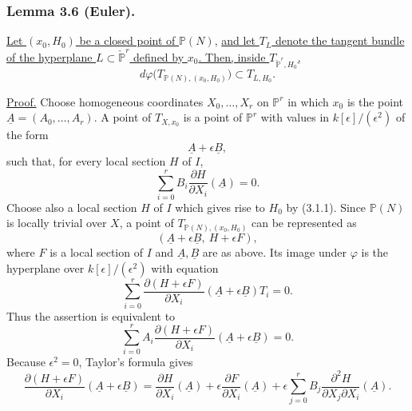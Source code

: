 \subsubsection*{Lemma 3.6 (Euler).}
\underline{Let $(x_0,H_0)$ be a closed point of $\mathbb P(N)$}, \underline{and
let $T_L$ denote the tangent bundle of the hyperplane
$L\subset\check{\mathbb P}^{r}$ defined by $x_0$.  Then, inside
$T_{\check{\mathbb P}^{r},H_0}$,}
\[
d\varphi\bigl(T_{\mathbb P(N),(x_0,H_0)}\bigr)
\subset T_{L,H_0}.
\]

\noindent\underline{Proof.}
Choose homogeneous coordinates $X_0,\ldots,X_r$ on $\mathbb P^r$ in
which $x_0$ is the point
$\underline A=(A_0,\ldots,A_r)$.  A point of $T_{X,x_0}$ is a point
of $\mathbb P^r$ with values in $k[\epsilon]/(\epsilon^2)$ of the
form
\begin{equation}\tag{3.6.1}
\underline A+\epsilon\underline B,
\end{equation}
such that, for every local section $H$ of $I$,
\begin{equation}\tag{3.6.2}
\sum_{i=0}^{r}B_i\frac{\partial H}{\partial X_i}(\underline A)=0.
\end{equation}
Choose also a local section $H$ of $I$ which gives rise to $H_0$ by
(3.1.1).  Since $\mathbb P(N)$ is locally trivial over $X$, a point
of $T_{\mathbb P(N),(x_0,H_0)}$ can be represented as
\begin{equation}\tag{3.6.3}
(\underline A+\epsilon\underline B,\ H+\epsilon F),
\end{equation}
where $F$ is a local section of $I$ and $\underline A,\underline B$
are as above.  Its image under $\varphi$ is the hyperplane over
$k[\epsilon]/(\epsilon^2)$ with equation
\begin{equation}\tag{3.6.4}
\sum_{i=0}^{r}
\frac{\partial(H+\epsilon F)}{\partial X_i}
(\underline A+\epsilon\underline B)T_i=0.
\end{equation}
Thus the assertion is equivalent to
\begin{equation}\tag{3.6.5}
\sum_{i=0}^{r}A_i
\frac{\partial(H+\epsilon F)}{\partial X_i}
(\underline A+\epsilon\underline B)=0.
\end{equation}
Because $\epsilon^2=0$, Taylor's formula gives
\begin{equation}\tag{3.6.6}
\frac{\partial(H+\epsilon F)}{\partial X_i}
(\underline A+\epsilon\underline B)
=\frac{\partial H}{\partial X_i}(\underline A)
+\epsilon\frac{\partial F}{\partial X_i}(\underline A)
+\epsilon\sum_{j=0}^{r}B_j
\frac{\partial^2H}{\partial X_j\partial X_i}(\underline A).
\end{equation}
